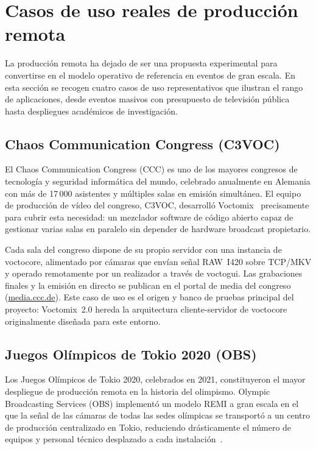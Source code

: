 \section{Casos de uso reales de producción remota}
\label{sec:casos_uso_remi}

La producción remota ha dejado de ser una propuesta experimental para convertirse en el
modelo operativo de referencia en eventos de gran escala. En esta sección se recogen
cuatro casos de uso representativos que ilustran el rango de aplicaciones, desde eventos
masivos con presupuesto de televisión pública hasta despliegues académicos de
investigación.

\subsection{Chaos Communication Congress (C3VOC)}

El Chaos Communication Congress (CCC) es uno de los mayores congresos de tecnología y
seguridad informática del mundo, celebrado anualmente en Alemania con más de 17\,000
asistentes y múltiples salas en emisión simultánea. El equipo de producción de vídeo del
congreso, C3VOC, desarrolló Voctomix~\cite{voctomix_github} precisamente para cubrir
esta necesidad: un mezclador software de código abierto capaz de gestionar varias salas
en paralelo sin depender de hardware broadcast propietario.

Cada sala del congreso dispone de su propio servidor con una instancia de voctocore,
alimentado por cámaras que envían señal RAW~I420 sobre TCP/MKV y operado remotamente
por un realizador a través de voctogui. Las grabaciones finales y la emisión en directo
se publican en el portal de media del congreso (\url{media.ccc.de}). Este caso de
uso es el origen y banco de pruebas principal del proyecto: Voctomix~2.0 hereda la
arquitectura cliente-servidor de voctocore originalmente diseñada para este entorno.

\subsection{Juegos Olímpicos de Tokio 2020 (OBS)}

Los Juegos Olímpicos de Tokio 2020, celebrados en 2021, constituyeron el mayor
despliegue de producción remota en la historia del olimpismo. Olympic Broadcasting
Services (OBS) implementó un modelo REMI a gran escala en el que la señal de las
cámaras de todas las sedes olímpicas se transportó a un centro de producción centralizado
en Tokio, reduciendo drásticamente el número de equipos y personal técnico desplazado
a cada instalación~\cite{obs_tokyo_2021}.

